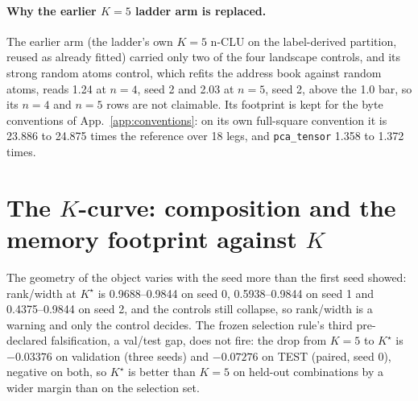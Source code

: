 \documentclass{article} %
\newcommand{\Kstar}{\ensuremath{K^{\star}}}
\begin{document}
\paragraph{Why the earlier $K=5$ ladder arm is replaced.} The earlier arm (the ladder's own
$K=5$ n-CLU on the label-derived partition, reused as already fitted) carried only two of the four
landscape controls, and its strong random atoms control, which refits the address book
against random atoms, reads 1.24 at $n=4$, seed 2 and 2.03 at $n=5$, seed 2, above the 1.0 bar, so %
its $n=4$ and $n=5$ rows are not claimable. Its footprint is kept for the byte conventions of
App.~\ref{app:conventions}: on its own full-square convention it is 23.886 to 24.875 times the %
reference over 18 legs, and \texttt{pca\_tensor} 1.358 to 1.372 times. %
\section{The $K$-curve: composition and the memory footprint against $K$}
\label{app:kcurve}

The geometry of the object varies with the seed more than the first seed showed:
rank/width at $\Kstar$ is 0.9688--0.9844 on seed 0, 0.5938--0.9844 on seed 1 and
0.4375--0.9844 on seed 2, and the controls still collapse, so rank/width is a warning and only the
control decides. %
The frozen selection rule's third pre-declared falsification, a val/test gap, does not fire:
the drop from $K=5$ to $\Kstar$ is $-0.03376$ on validation (three seeds) and $-0.07276$ on
TEST (paired, seed 0), negative on both, so $\Kstar$ is better than $K=5$ on held-out combinations
by a wider margin than on the selection set. %
\end{document}
